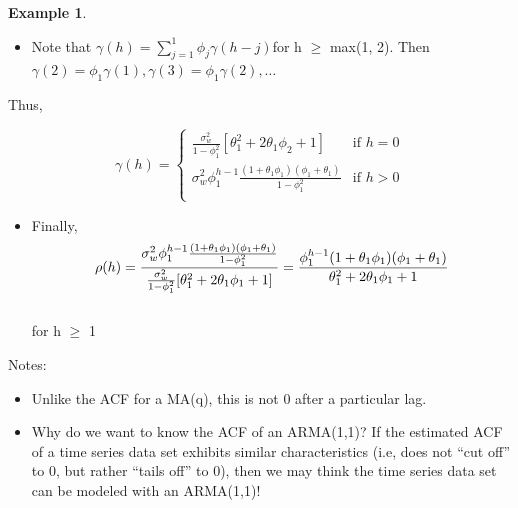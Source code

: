 \documentclass[
]{book}
\providecommand{\tightlist}{%
  \setlength{\itemsep}{0pt}\setlength{\parskip}{0pt}}
\theoremstyle{definition}
\theoremstyle{definition}
\newtheorem{example}{Example}[chapter]
\theoremstyle{definition}
\theoremstyle{definition}
\theoremstyle{remark}
\begin{document}
\begin{example}
\begin{itemize}
\tightlist
\item
  Note that \(\gamma(h) = \sum_{j=1}^{1}\phi_j\gamma(h-j)\)for h \(\ge\) max(1, 2). Then \(\gamma(2) = \phi_1\gamma(1), \gamma(3) = \phi_1\gamma(2), …\)
\end{itemize}

Thus,

\[
\gamma(h)=
\begin{cases}
  \frac{\sigma_w^2}{1-\phi_1^2}[\theta_1^2+2\theta_1\phi_2+1]   & \text{if } h=0 \\
  \sigma_w^2\phi_1^{h-1}\frac{(1+\theta_1\phi_1)(\phi_1+\theta_1)}{1-\phi_1^2}  & \text{if } h>0 \\
\end{cases}
\]

\begin{itemize}
\tightlist
\item
  Finally,
  \[\rho(h) =\frac{\sigma_w^2\phi_1^{h-1}\frac{(1+\theta_1\phi_1)(\phi_1+\theta_1)}{1-\phi_1^2}}{\frac{\sigma_w^2}{1-\phi_1^2}[\theta_1^2+2\theta_1\phi_1+1]}\\
  =\frac{\phi_1^{h-1}(1+\theta_1\phi_1)(\phi_1+\theta_1)}{\theta_1^2+2\theta_1\phi_1+1}\]\\
  for h \(\ge\) 1
\end{itemize}

\end{example}

Notes:

\begin{itemize}
\tightlist
\item
  Unlike the ACF for a MA(q), this is not 0 after a particular lag.\\
\item
  Why do we want to know the ACF of an ARMA(1,1)? If the estimated ACF of a time series data set exhibits similar characteristics (i.e, does not ``cut off'' to 0, but rather ``tails off'' to 0), then we may think the time series data set can be modeled with an ARMA(1,1)!
\end{itemize}
\end{document}
